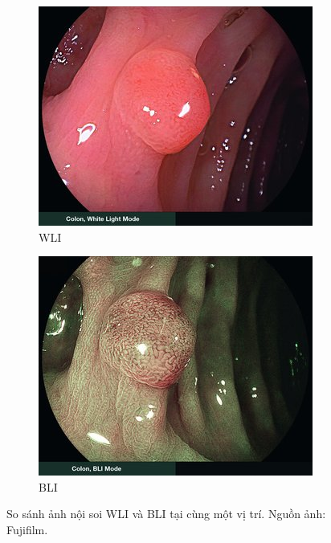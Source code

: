 \documentclass[12pt]{extreport}
\begin{document}
\begin{figure}[H]
    \centering
    \begin{subfigure}[H]{0.45\textwidth}
        \centering
        \includegraphics[width=\linewidth]{figure19.jpg}
        \caption{WLI}
    \end{subfigure}
    \begin{subfigure}[H]{0.45\textwidth}
        \centering
        \includegraphics[width=\linewidth]{figure18.jpg}
        \caption{BLI}
    \end{subfigure}
    \caption{So sánh ảnh nội soi WLI và BLI tại cùng một vị trí. Nguồn ảnh: Fujifilm.}
\end{figure}
\end{document}
